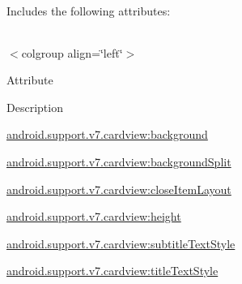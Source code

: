 Includes the following attributes\+:

\tabulinesep=1mm
\begin{longtabu} spread 0pt [c]{*{0}{|X[-1]}|}
\hline
\end{longtabu}
$<$colgroup align=\char`\"{}left\char`\"{}$>$ 

Attribute

Description 

{\ttfamily \hyperlink{classandroid_1_1support_1_1v7_1_1cardview_1_1R_1_1styleable_a827ccfc36023037b85ac808303415574}{android.\+support.\+v7.\+cardview\+:background}}

{\ttfamily \hyperlink{classandroid_1_1support_1_1v7_1_1cardview_1_1R_1_1styleable_a1ff81fea394e8d3fc2d0bac1f401a6b3}{android.\+support.\+v7.\+cardview\+:background\+Split}}

{\ttfamily \hyperlink{classandroid_1_1support_1_1v7_1_1cardview_1_1R_1_1styleable_ad542200fde77c9d47f12726ea555d1ae}{android.\+support.\+v7.\+cardview\+:close\+Item\+Layout}}

{\ttfamily \hyperlink{classandroid_1_1support_1_1v7_1_1cardview_1_1R_1_1styleable_a5e1ce0fbbed4e137f757b2513a06826c}{android.\+support.\+v7.\+cardview\+:height}}

{\ttfamily \hyperlink{classandroid_1_1support_1_1v7_1_1cardview_1_1R_1_1styleable_a4e31cf5933cdeb00f2f52de225b74ceb}{android.\+support.\+v7.\+cardview\+:subtitle\+Text\+Style}}

{\ttfamily \hyperlink{classandroid_1_1support_1_1v7_1_1cardview_1_1R_1_1styleable_a92d5caac9795b056f4da8a56c8588ee3}{android.\+support.\+v7.\+cardview\+:title\+Text\+Style}}

